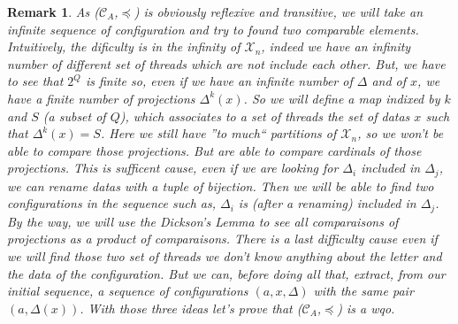 \documentclass[a4paper,10pt]{report}
\newtheorem{rk}{Remark}
\newcommand{\C}{\mathcal{C}_{A}}
\newcommand{\X}{\mathcal{X}_{n}}
\begin{document}
\begin{rk}
  As ($\C$,$\preceq$) is obviously reflexive and transitive, we will take an infinite sequence of configuration and try to found two comparable elements.
  Intuitively, the dificulty is in the infinity of $\X$, indeed we have an infinity number of different set of threads which are not include each other.
  But, we have to see that $2^Q$ is finite so, even if we have an infinite number of $\Delta$ and of $x$, we have a finite number of projections $\Delta^k(x)$.
  So we will define a map indixed by $k$ and $S$ (a subset of $Q$), which associates to a set of threads the set of datas $x$ such that $\Delta^k(x) = S$.
  Here we still have ''to much``  partitions of $\X$,  so we won't be able to compare those projections.
  But are able to compare cardinals of those projections.
  This is sufficent cause, even if we are looking for $\Delta_i$ included in $\Delta_j$, we can rename datas with a tuple of bijection.
  Then we will be able to find two configurations in the sequence such as, $\Delta_i$ is (after a renaming) included in $\Delta_j$.
  By the way, we will use the Dickson's Lemma to see all comparaisons of projections as a product of comparaisons.
  There is a last difficulty cause even if we will find those two set of threads we don't know anything about the letter and the data of the configuration.
  But we can, before doing all that, extract, from our initial sequence, a sequence of configurations $(a,x,\Delta)$ with the same pair $(a,\Delta(x))$.
  With those three ideas let's prove that ($\C$,$\preceq$) is a wqo.
\end{rk}
\end{document}
